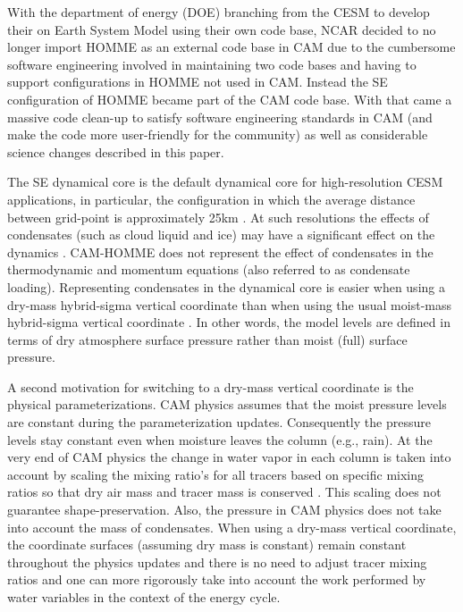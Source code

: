 \documentclass{agujournal}
\begin{document}
{With the department of energy (DOE) branching from the CESM to develop their on Earth System Model using their own code base, NCAR decided to no longer import HOMME as an external code base in CAM due to the cumbersome software engineering involved in maintaining two code bases and having to support configurations in HOMME not used in CAM. Instead the SE configuration of HOMME became part of the CAM code base. With that came a massive code clean-up to satisfy software engineering standards in CAM (and make the code more user-friendly for the community) as well as considerable science changes described in this paper.

The SE dynamical core is the default dynamical core for high-resolution CESM applications, in particular, the configuration in which the average distance between grid-point is approximately 25km \citep{BetAl2013JC}. At such resolutions the effects of condensates (such as cloud liquid and ice) may have a significant effect on the dynamics \citep{BLDT2012GRL}. CAM-HOMME does not represent the effect of condensates in the thermodynamic and momentum equations (also referred to as condensate loading). Representing condensates in the dynamical core is easier when using a dry-mass hybrid-sigma vertical coordinate than when using the usual moist-mass hybrid-sigma vertical coordinate \citep[e.g., ][]{SB1981MWR}. In other words, the model levels are defined in terms of dry atmosphere surface pressure rather than moist (full) surface pressure.

A second motivation for switching to a dry-mass vertical coordinate is the physical parameterizations. CAM physics assumes that the moist pressure levels are constant during the parameterization updates. Consequently the pressure levels stay constant even when moisture leaves the column (e.g., rain). At the very end of CAM physics the change in water  vapor in each column is taken into account by scaling the mixing ratio's for all tracers based on specific mixing ratios so that dry air mass and tracer mass is conserved \citep[see Section 3.1.6 in ][]{CAM5}. This scaling does not guarantee shape-preservation. Also, the pressure in CAM physics does not take into account the mass of condensates. When using a dry-mass vertical coordinate, the coordinate surfaces (assuming dry mass is constant) remain constant throughout the physics updates and there is no need to adjust tracer mixing ratios and one can more rigorously take into account the work performed by water variables in the context of the energy cycle.

}
\end{document}

